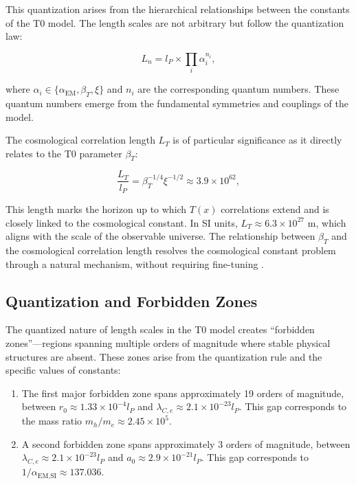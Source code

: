 \documentclass[twocolumn,aps,prl]{revtex4-2}
\begin{document}
	This quantization arises from the hierarchical relationships between the constants of the T0 model. The length scales are not arbitrary but follow the quantization law:
	
	\begin{equation}
		L_n = l_P \times \prod_i \alpha_i^{n_i}, \label{eq:detailed_quantization}
	\end{equation}
	
	where $\alpha_i \in \{\alpha_{\text{EM}}, \beta_T, \xi\}$ and $n_i$ are the corresponding quantum numbers. These quantum numbers emerge from the fundamental symmetries and couplings of the model.
	
	The cosmological correlation length $L_T$ is of particular significance as it directly relates to the T0 parameter $\beta_T$:
	
	\begin{equation}
		\frac{L_T}{l_P} = \beta_T^{-1/4} \xi^{-1/2} \approx 3.9 \times 10^{62}, \label{eq:correlation_length}
	\end{equation}
	
	This length marks the horizon up to which $T(x)$ correlations extend and is closely linked to the cosmological constant. In SI units, $L_T \approx 6.3 \times 10^{27}$ m, which aligns with the scale of the observable universe. The relationship between $\beta_T$ and the cosmological correlation length resolves the cosmological constant problem through a natural mechanism, without requiring fine-tuning \cite{pascher_energiedynamik_2025}.
	
	\subsection{Quantization and Forbidden Zones}
	\label{subsec:quantization}
	
	The quantized nature of length scales in the T0 model creates “forbidden zones”—regions spanning multiple orders of magnitude where stable physical structures are absent. These zones arise from the quantization rule and the specific values of constants:
	
	\begin{enumerate}
		\item The first major forbidden zone spans approximately 19 orders of magnitude, between $r_0 \approx 1.33 \times 10^{-4} l_P$ and $\lambda_{C,e} \approx 2.1 \times 10^{-23} l_P$. This gap corresponds to the mass ratio $m_h/m_e \approx 2.45 \times 10^5$.
		\item A second forbidden zone spans approximately 3 orders of magnitude, between $\lambda_{C,e} \approx 2.1 \times 10^{-23} l_P$ and $a_0 \approx 2.9 \times 10^{-21} l_P$. This gap corresponds to $1/\alpha_{\text{EM,SI}} \approx 137.036$.
	\end{enumerate}
	
\end{document}
